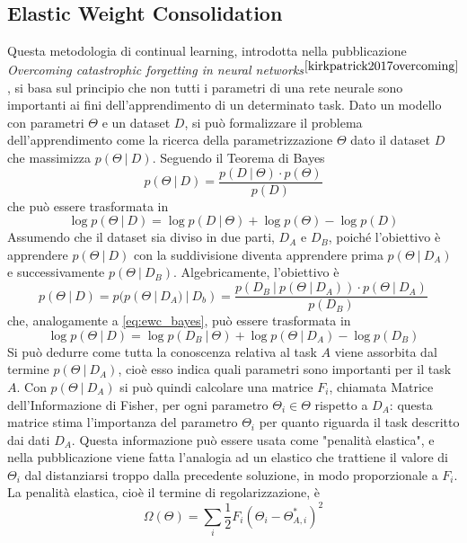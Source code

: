 \subsection{Elastic Weight Consolidation}
Questa metodologia di continual learning, introdotta nella pubblicazione \textit{Overcoming catastrophic forgetting in neural networks}$^{\cite{kirkpatrick2017overcoming}}$, si basa sul principio che non tutti i parametri di una rete neurale sono importanti ai fini dell'apprendimento di un determinato task. Dato un modello con parametri $\Theta$ e un dataset $D$, si può formalizzare il problema dell'apprendimento come la ricerca della parametrizzazione $\Theta$ dato il dataset $D$ che massimizza $p(\Theta\:|\:D)$. Seguendo il Teorema di Bayes
\begin{equation}\label{eq:ewc_bayes}
    p(\Theta\:|\:D) = \frac{p(D\:|\:\Theta)\cdot p(\Theta)}{p(D)}
\end{equation}
che può essere trasformata in 
\begin{equation}\label{eq:ewc_bayes2}
    \log p(\Theta\:|\:D) = \log p(D\:|\:\Theta) + \log p(\Theta) - \log p(D)
\end{equation}
Assumendo che il dataset sia diviso in due parti, $D_A$ e $D_B$, poiché l'obiettivo è apprendere $p(\Theta\:|\:D)$ con la suddivisione diventa apprendere prima $p(\Theta\:|\:D_A)$ e successivamente $p(\Theta\:|\:D_B)$. Algebricamente, l'obiettivo è
\begin{equation}\label{eq:ewc2}
    p(\Theta\:|\:D) = p(p(\Theta\:|\:D_A)\:|\:D_b) = \frac{p(D_B\:|\:p(\Theta\:|\:D_A))\cdot p(\Theta\:|\:D_A)}{p(D_B)}
\end{equation}
che, analogamente a \ref{eq:ewc_bayes}, può essere trasformata in
\begin{equation}\label{eq:ewc3}
    \log p(\Theta\:|\:D) = \log p(D_B\:|\:\Theta) + \log p(\Theta\:|\:D_A) - \log p(D_B)
\end{equation}
Si può dedurre come tutta la conoscenza relativa al task $A$ viene assorbita dal termine $p(\Theta\:|\: D_A)$, cioè esso indica quali parametri sono importanti per il task $A$. Con $p(\Theta\:|\: D_A)$ si può quindi calcolare una matrice $F_i$, chiamata Matrice dell'Informazione di Fisher, per ogni parametro $\Theta_i \in \Theta$ rispetto a $D_A$: questa matrice stima l'importanza del parametro $\Theta_i$ per quanto riguarda il task descritto dai dati $D_A$. Questa informazione può essere usata come "penalità elastica", e nella pubblicazione viene fatta l'analogia ad un elastico che trattiene il valore di $\Theta_i$ dal distanziarsi troppo dalla precedente soluzione, in modo proporzionale a $F_i$. La penalità elastica, cioè il termine di regolarizzazione, è\begin{equation}\label{eq:ewc_penalty}
    \Omega(\Theta) = \sum_i \frac{1}{2} F_i\left(\Theta_i - \Theta_{A,i}^*\right)^2
\end{equation}
